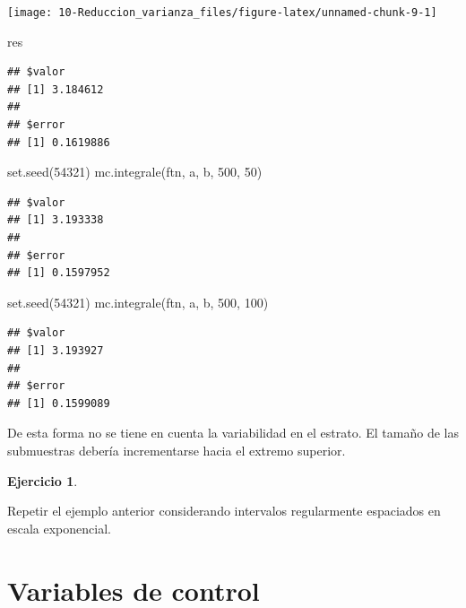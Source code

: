 \documentclass[
]{book}
\newenvironment{Shaded}{\begin{snugshade}}{\end{snugshade}}
\newcommand{\DecValTok}[1]{\textcolor[rgb]{0.00,0.00,0.81}{#1}}
\newcommand{\FunctionTok}[1]{\textcolor[rgb]{0.00,0.00,0.00}{#1}}
\newcommand{\NormalTok}[1]{#1}
\theoremstyle{break}
\theoremstyle{definition}
\theoremstyle{definition}
\theoremstyle{definition}
\newtheorem{exercise}{Ejercicio}[chapter]
\theoremstyle{definition}
\theoremstyle{remark}
\begin{document}
\begin{center}\texttt{[image: 10-Reduccion\_varianza\_files/figure-latex/unnamed-chunk-9-1]} \end{center}

\begin{Shaded}
\begin{Highlighting}[]
\NormalTok{res}
\end{Highlighting}
\end{Shaded}

\begin{verbatim}
## $valor
## [1] 3.184612
## 
## $error
## [1] 0.1619886
\end{verbatim}

\begin{Shaded}
\begin{Highlighting}[]
\FunctionTok{set.seed}\NormalTok{(}\DecValTok{54321}\NormalTok{)}
\FunctionTok{mc.integrale}\NormalTok{(ftn, a, b, }\DecValTok{500}\NormalTok{, }\DecValTok{50}\NormalTok{)}
\end{Highlighting}
\end{Shaded}

\begin{verbatim}
## $valor
## [1] 3.193338
## 
## $error
## [1] 0.1597952
\end{verbatim}

\begin{Shaded}
\begin{Highlighting}[]
\FunctionTok{set.seed}\NormalTok{(}\DecValTok{54321}\NormalTok{)}
\FunctionTok{mc.integrale}\NormalTok{(ftn, a, b, }\DecValTok{500}\NormalTok{, }\DecValTok{100}\NormalTok{)}
\end{Highlighting}
\end{Shaded}

\begin{verbatim}
## $valor
## [1] 3.193927
## 
## $error
## [1] 0.1599089
\end{verbatim}

De esta forma no se tiene en cuenta la variabilidad en el estrato.
El tamaño de las submuestras debería incrementarse hacia el extremo superior.

\begin{exercise}
\protect\hypertarget{exr:mc-integraleb}{}{\label{exr:mc-integraleb} }
\end{exercise}
Repetir el ejemplo anterior considerando intervalos regularmente espaciados en escala exponencial.

\hypertarget{variables-de-control}{%
\section{Variables de control}\label{variables-de-control}}
\end{document}
